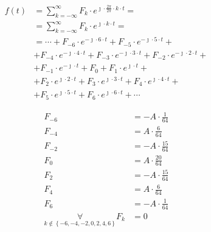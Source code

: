 \begin{task}
\begin{align*}
f(t) &= \sum_{k=-\infty}^{\infty} F_k \cdot e^{\jmath \cdot \frac{2\pi}{2\pi} \cdot k \cdot t}=\\
&=\sum_{k=-\infty}^{\infty} F_k \cdot e^{\jmath \cdot k \cdot t}=\\
&=\cdots + F_{-6} \cdot e^{-\jmath \cdot 6 \cdot t} + F_{-5} \cdot e^{-\jmath \cdot 5 \cdot t} + \\
&+F_{-4} \cdot e^{-\jmath \cdot 4 \cdot t} +F_{-3} \cdot e^{-\jmath \cdot 3 \cdot t} + F_{-2} \cdot e^{-\jmath \cdot 2 \cdot t} +\\
&+F_{-1} \cdot e^{-\jmath \cdot t} + F_0 + F_{1} \cdot e^{\jmath \cdot t} +\\
&+F_{2} \cdot e^{\jmath \cdot 2 \cdot t} +F_{3} \cdot e^{\jmath \cdot 3 \cdot t} +F_{4} \cdot e^{\jmath \cdot 4 \cdot t} +\\
& +F_{5} \cdot e^{\jmath \cdot 5 \cdot t} +F_{6} \cdot e^{\jmath \cdot 6 \cdot t} + \cdots
\end{align*}


\begin{align*}
F_{-6} &= -A\cdot \frac{1}{64}\\
F_{-4} &= A\cdot \frac{6}{64}\\
F_{-2} &=-A\cdot \frac{15}{64}\\
F_{0}  &=A\cdot \frac{20}{64}\\
F_{2} &=-A\cdot \frac{15}{64}\\
F_{4} &= A\cdot \frac{6}{64}\\
F_{6} &= -A\cdot \frac{1}{64}\\
\underset{k \notin \left\{-6,-4,-2,0,2,4,6\right\}}{\forall} F_k &= 0
\end{align*}



\end{task}
